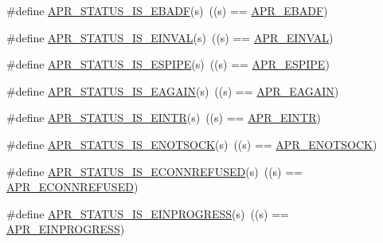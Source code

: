 \begin{DoxyCompactItemize}
\item 
\#define \hyperlink{group___a_p_r___s_t_a_t_u_s___i_s_gaa843153a73806cca500287940e9f175f}{A\-P\-R\-\_\-\-S\-T\-A\-T\-U\-S\-\_\-\-I\-S\-\_\-\-E\-B\-A\-D\-F}(s)~((s) == \hyperlink{group___a_p_r___error_ga204df8a37a5c7fd6b2c74ea098fbac02}{A\-P\-R\-\_\-\-E\-B\-A\-D\-F})
\item 
\#define \hyperlink{group___a_p_r___s_t_a_t_u_s___i_s_ga3f620bb28c1c7f6fd3412dac2137d0fd}{A\-P\-R\-\_\-\-S\-T\-A\-T\-U\-S\-\_\-\-I\-S\-\_\-\-E\-I\-N\-V\-A\-L}(s)~((s) == \hyperlink{group___a_p_r___error_gae3ffc41994444e71ce522c036ca1d9a4}{A\-P\-R\-\_\-\-E\-I\-N\-V\-A\-L})
\item 
\#define \hyperlink{group___a_p_r___s_t_a_t_u_s___i_s_gac9b1e593377ac3b93b259f30f04a1185}{A\-P\-R\-\_\-\-S\-T\-A\-T\-U\-S\-\_\-\-I\-S\-\_\-\-E\-S\-P\-I\-P\-E}(s)~((s) == \hyperlink{group___a_p_r___error_ga3be81035cd2da76fbc27c75496489359}{A\-P\-R\-\_\-\-E\-S\-P\-I\-P\-E})
\item 
\#define \hyperlink{group___a_p_r___s_t_a_t_u_s___i_s_ga9dd578bfcd76a2d997395608ae5b3a4e}{A\-P\-R\-\_\-\-S\-T\-A\-T\-U\-S\-\_\-\-I\-S\-\_\-\-E\-A\-G\-A\-I\-N}(s)~((s) == \hyperlink{group___a_p_r___error_ga0b2a5ebb819de5ce93d326939b586578}{A\-P\-R\-\_\-\-E\-A\-G\-A\-I\-N})
\item 
\#define \hyperlink{group___a_p_r___s_t_a_t_u_s___i_s_ga30615baf6479221e44870c620e372b5b}{A\-P\-R\-\_\-\-S\-T\-A\-T\-U\-S\-\_\-\-I\-S\-\_\-\-E\-I\-N\-T\-R}(s)~((s) == \hyperlink{group___a_p_r___error_gaee1ce306c0ebf1701b34172310aa1bd5}{A\-P\-R\-\_\-\-E\-I\-N\-T\-R})
\item 
\#define \hyperlink{group___a_p_r___s_t_a_t_u_s___i_s_ga7b7807755d3d6f24e9978337b9faa5a1}{A\-P\-R\-\_\-\-S\-T\-A\-T\-U\-S\-\_\-\-I\-S\-\_\-\-E\-N\-O\-T\-S\-O\-C\-K}(s)~((s) == \hyperlink{group___a_p_r___error_gad456312527050c661dc19a8f17a0f0ef}{A\-P\-R\-\_\-\-E\-N\-O\-T\-S\-O\-C\-K})
\item 
\#define \hyperlink{group___a_p_r___s_t_a_t_u_s___i_s_ga4decf55c5cea9660a44fed0c74265ee6}{A\-P\-R\-\_\-\-S\-T\-A\-T\-U\-S\-\_\-\-I\-S\-\_\-\-E\-C\-O\-N\-N\-R\-E\-F\-U\-S\-E\-D}(s)~((s) == \hyperlink{group___a_p_r___error_ga1b4d1d847bebdfc48af343bc2486ecb8}{A\-P\-R\-\_\-\-E\-C\-O\-N\-N\-R\-E\-F\-U\-S\-E\-D})
\item 
\#define \hyperlink{group___a_p_r___s_t_a_t_u_s___i_s_ga777e9ba36fe05ac8002113a9597073ea}{A\-P\-R\-\_\-\-S\-T\-A\-T\-U\-S\-\_\-\-I\-S\-\_\-\-E\-I\-N\-P\-R\-O\-G\-R\-E\-S\-S}(s)~((s) == \hyperlink{group___a_p_r___error_ga5c311361f4f68f289c90f3cdfd77eb79}{A\-P\-R\-\_\-\-E\-I\-N\-P\-R\-O\-G\-R\-E\-S\-S})

\end{DoxyCompactItemize}
